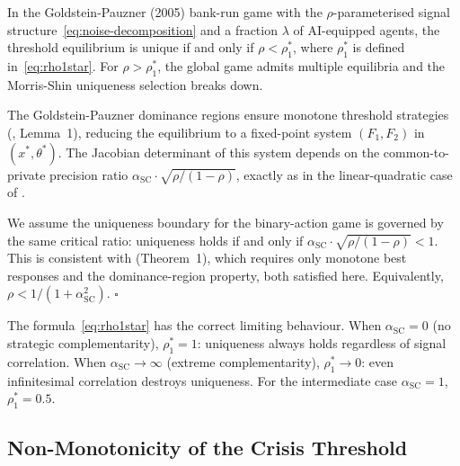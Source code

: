 \begin{proposition}\label{prop:uniqueness-boundary}
  In the Goldstein-Pauzner (2005) bank-run game with the $\rho$-parameterised signal structure~\eqref{eq:noise-decomposition} and a fraction $\lambda$ of AI-equipped agents, the threshold equilibrium is unique if and only if $\rho < \rho_1^*$, where $\rho_1^*$ is defined in~\eqref{eq:rho1star}.
  For $\rho > \rho_1^*$, the global game admits multiple equilibria and the Morris-Shin uniqueness selection breaks down.

   The Goldstein-Pauzner dominance regions ensure monotone threshold strategies (\citealt{goldstein2005}, Lemma~1), reducing the equilibrium to a fixed-point system $(F_1, F_2)$ in $(x^*, \theta^*)$. The Jacobian determinant of this system depends on the common-to-private precision ratio $\alpha_{\text{SC}} \cdot \sqrt{\rho/(1-\rho)}$, exactly as in the linear-quadratic case of \citet{morris2003}.

   We assume the uniqueness boundary for the binary-action game is governed by the same critical ratio: uniqueness holds if and only if $\alpha_{\text{SC}} \cdot \sqrt{\rho/(1-\rho)} < 1$. This is consistent with \citet{hellwig2002} (Theorem~1), which requires only monotone best responses and the dominance-region property, both satisfied here. Equivalently, $\rho < 1/(1+\alpha_{\text{SC}}^2)$. $\square$
\end{proposition}

The formula~\eqref{eq:rho1star} has the correct limiting behaviour. When $\alpha_{\text{SC}} = 0$ (no strategic complementarity), $\rho_1^* = 1$: uniqueness always holds regardless of signal correlation. When $\alpha_{\text{SC}} \to \infty$ (extreme complementarity), $\rho_1^* \to 0$: even infinitesimal correlation destroys uniqueness. For the intermediate case $\alpha_{\text{SC}} = 1$, $\rho_1^* = 0.5$.

\subsection{Non-Monotonicity of the Crisis Threshold}

